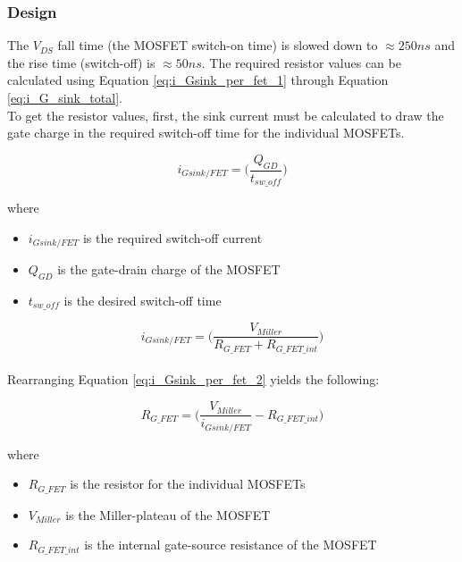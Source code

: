 \subsubsection{Design}
\label{sec:DriverDesign}

The $V_{DS}$ fall time (the MOSFET switch-on time) is slowed down to $\approx 250ns$ and the rise time (switch-off) is $\approx 50ns$. The required resistor values can be calculated using Equation \ref{eq:i_Gsink_per_fet_1} through Equation \ref{eq:i_G_sink_total}. \\

To get the resistor values, first, the sink current must be calculated to draw the gate charge in the required switch-off time for the individual MOSFETs. 

    \begin{equation}
        i_{Gsink/FET} = \bigg( \frac{Q_{GD}}{t_{sw{\_}off}} \bigg)
        \label{eq:i_Gsink_per_fet_1}
    \end{equation}
    
    where
    
    \begin{itemize}
        \item $i_{Gsink/FET}$ is the required switch-off current
        \item $Q_{GD}$ is the gate-drain charge of the MOSFET
        \item $t_{sw{\_}off}$ is the desired switch-off time
    \end{itemize}
    
    \begin{equation}
        i_{Gsink/FET} = \bigg( \frac{V_{Miller}}{R_{G{\_}FET} + R_{G{\_}FET{\_}int}} \bigg)
        \label{eq:i_Gsink_per_fet_2}
    \end{equation} \\
    
    Rearranging Equation \ref{eq:i_Gsink_per_fet_2} yields the following:
    
    \begin{equation}
        R_{G{\_}FET} = \bigg( \frac{V_{Miller}}{i_{Gsink/FET}} - R_{G{\_}FET{\_}int} \bigg)
        \label{eq:i_Gsink_per_fet_2}
    \end{equation}
    
    where
    
    \begin{itemize}
        \item $R_{G{\_}FET}$ is the resistor for the individual MOSFETs
        \item $V_{Miller}$ is the Miller-plateau of the MOSFET
        \item $R_{G{\_}FET{\_}int}$ is the internal gate-source resistance of the MOSFET
    \end{itemize}
    
